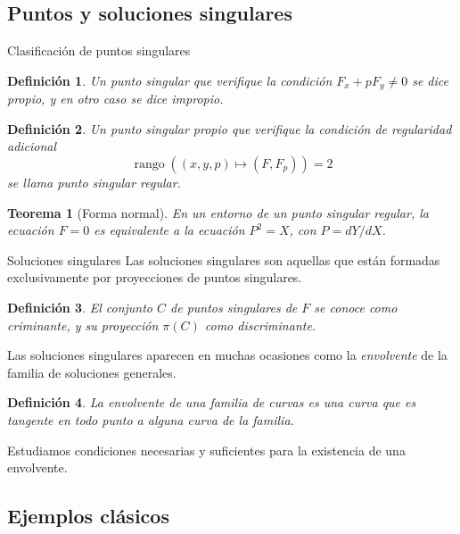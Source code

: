 \documentclass[10pt, spanish]{beamer}
\newtheorem{teorema}{Teorema}
\newtheorem{defi}{Definición}
\begin{document}
\subsection{Puntos y soluciones singulares}

\begin{frame}{Clasificación de puntos singulares}
  \begin{defi}
    Un punto singular que verifique la condición $F_x+pF_y\neq 0$ se dice \textit{propio}, y en otro caso se dice \textit{impropio}.
  \end{defi}
  \begin{defi}
    Un punto singular propio que verifique la condición de regularidad adicional
    \[
      \operatorname{rango}((x,y,p)\mapsto(F, F_p))=2
    \]
    se llama punto singular \textit{regular}.
  \end{defi}

  \begin{teorema}[Forma normal]
    En un entorno de un punto singular regular, la ecuación $F=0$ es equivalente a la ecuación $P^2=X$, con $P=dY/dX$.
  \end{teorema}
\end{frame}

\begin{frame}{Soluciones singulares}
  Las soluciones singulares son aquellas que están formadas exclusivamente por proyecciones de puntos singulares.

  \begin{defi}
    El conjunto $C$ de puntos singulares de $F$ se conoce como \textit{criminante}, y su proyección $\pi(C)$ como \textit{discriminante}.
  \end{defi}

  Las soluciones singulares aparecen en muchas ocasiones como la \textit{envolvente} de la familia de soluciones generales.

  \begin{defi}
    La envolvente de una familia de curvas es una curva que es tangente en todo punto a alguna curva de la familia.
  \end{defi}

  Estudiamos condiciones necesarias y suficientes para la existencia de una envolvente.
\end{frame}


\subsection{Ejemplos clásicos}
\end{document}
